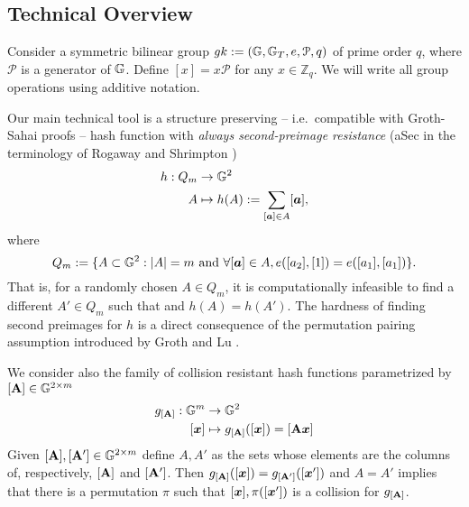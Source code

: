
%

\subsection{Technical Overview}
Consider a symmetric bilinear group $gk:=(\mathbb{G},\mathbb{G}_T,e,\mathcal{P},q)$ of prime order $q$, where $\mathcal{P}$ is a generator of $\mathbb{G}$. Define $[x]=x\mathcal{P}$ for any $x\in\mathbb{Z}_q$.  We will write all group operations using additive notation.

Our main technical tool is a structure preserving -- i.e.~compatible with Groth-Sahai proofs -- hash function with \emph{always second-preimage resistance} (aSec in the terminology of Rogaway and Shrimpton \cite{FSE:RogShr04})
\begin{align*}
h : Q_m &\to \mathbb{G}^2\\
      A &\mapsto h(A) := \sum_{[{\boldsymbol{a}}]\in A} [{\boldsymbol{a}}],
\end{align*}
 where
$$
Q_m:= \{A\subset\mathbb{G}^2: |A|=m \text{ and }\forall [{\boldsymbol{a}}]\in A, e([a_2],[1])=e([a_1],[a_1])\}.
$$
That is, for a randomly chosen $A\in Q_m$, it is computationally infeasible to find a different $A'\in Q_m$ such that and $h(A)=h(A')$. The hardness of finding second preimages for $h$ is a direct consequence of the permutation pairing assumption introduced by Groth and Lu \cite{AC:GroLu07}.

We consider also the family of collision resistant hash functions parametrized by $[\mathbf{{A}}]\in\mathbb{G}^{2\times m}$
\begin{align*}
g_{[\matr{A}]} : \GG^m &\to \GG^2\\
           [\vecb{x}] &\mapsto g_{[\matr{A}]}([\vecb{x}]) = [\matr{A}\vecb{x}]
\end{align*}
Given $[\mathbf{{A}}],[\mathbf{{A}}']\in\mathbb{G}^{2\times m}$ define $A,A'$ as the sets whose elements are the columns of, respectively, $[\mathbf{{A}}]$ and $[\mathbf{{A}}']$. Then $g_{[\mathbf{{A}}]}([{\boldsymbol{x}}]) = g_{[\mathbf{{A}}']}([{\boldsymbol{x}}'])$ and $A=A'$ implies that there is a permutation $\pi$ such that $[{\boldsymbol{x}}],\pi([{\boldsymbol{x}}'])$ is a collision for $g_{[\mathbf{{A}}]}$.
 
